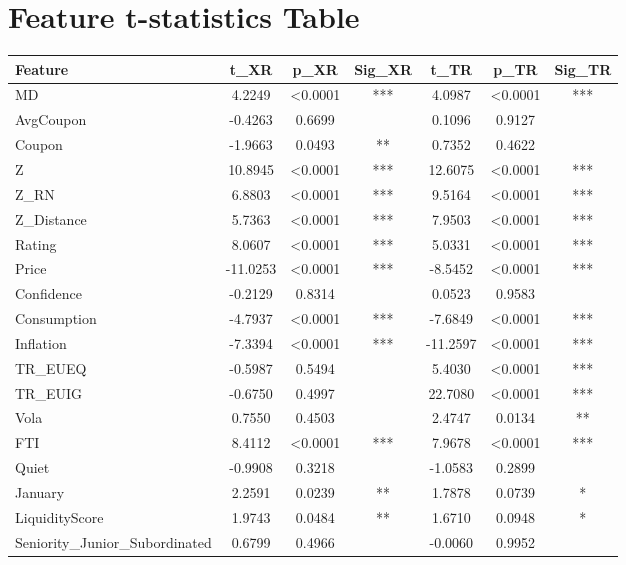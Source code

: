 \section{Feature t-statistics Table}
\begin{center}
\begin{minipage}{\textwidth}
    \centering
    \small
    \begin{tabular}{lcccccc}
    \toprule
    \textbf{Feature} & \textbf{t\_XR} & \textbf{p\_XR} & \textbf{Sig\_XR} & \textbf{t\_TR} & \textbf{p\_TR} & \textbf{Sig\_TR} \\
    \midrule
    MD & 4.2249 & <0.0001 & *** & 4.0987 & <0.0001 & *** \\
    AvgCoupon & -0.4263 & 0.6699 &  & 0.1096 & 0.9127 &  \\
    Coupon & -1.9663 & 0.0493 & ** & 0.7352 & 0.4622 &  \\
    Z & 10.8945 & <0.0001 & *** & 12.6075 & <0.0001 & *** \\
    Z\_RN & 6.8803 & <0.0001 & *** & 9.5164 & <0.0001 & *** \\
    Z\_Distance & 5.7363 & <0.0001 & *** & 7.9503 & <0.0001 & *** \\
    Rating & 8.0607 & <0.0001 & *** & 5.0331 & <0.0001 & *** \\
    Price & -11.0253 & <0.0001 & *** & -8.5452 & <0.0001 & *** \\
    Confidence & -0.2129 & 0.8314 &  & 0.0523 & 0.9583 &  \\
    Consumption & -4.7937 & <0.0001 & *** & -7.6849 & <0.0001 & *** \\
    Inflation & -7.3394 & <0.0001 & *** & -11.2597 & <0.0001 & *** \\
    TR\_EUEQ & -0.5987 & 0.5494 &  & 5.4030 & <0.0001 & *** \\
    TR\_EUIG & -0.6750 & 0.4997 &  & 22.7080 & <0.0001 & *** \\
    Vola & 0.7550 & 0.4503 &  & 2.4747 & 0.0134 & ** \\
    FTI & 8.4112 & <0.0001 & *** & 7.9678 & <0.0001 & *** \\
    Quiet & -0.9908 & 0.3218 &  & -1.0583 & 0.2899 &  \\
    January & 2.2591 & 0.0239 & ** & 1.7878 & 0.0739 & * \\
    LiquidityScore & 1.9743 & 0.0484 & ** & 1.6710 & 0.0948 & * \\
    Seniority\_Junior\_Subordinated & 0.6799 & 0.4966 &  & -0.0060 & 0.9952 &  \\

\end{tabular}
\end{minipage}
\end{center}
